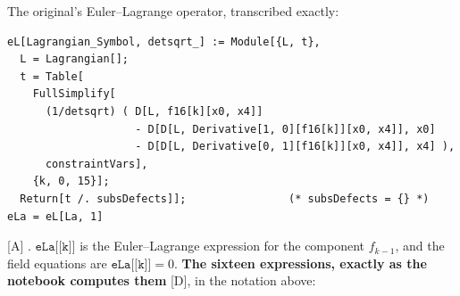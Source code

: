 The original's Euler--Lagrange operator, transcribed exactly:
\begin{footnotesize}
\begin{verbatim}
eL[Lagrangian_Symbol, detsqrt_] := Module[{L, t},
  L = Lagrangian[];
  t = Table[
    FullSimplify[
      (1/detsqrt) ( D[L, f16[k][x0, x4]]
                    - D[D[L, Derivative[1, 0][f16[k]][x0, x4]], x0]
                    - D[D[L, Derivative[0, 1][f16[k]][x0, x4]], x4] ),
      constraintVars],
    {k, 0, 15}];
  Return[t /. subsDefects]];                (* subsDefects = {} *)
eLa = eL[La, 1]
\end{verbatim}
\end{footnotesize}
[A] . $\texttt{eLa[[k]]}$ is the Euler--Lagrange
expression for the component $f_{k-1}$, and the field equations are $\texttt{eLa[[k]]}=0$.
\textbf{The sixteen expressions, exactly as the notebook computes them} [D], in the notation above:
